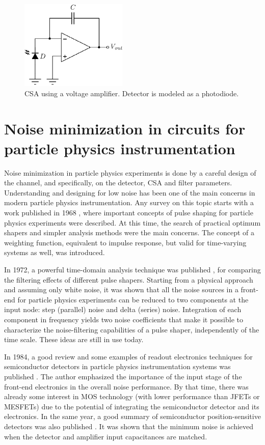 \begin{figure}[!t]
	\centering
	\includegraphics[width=2in]{./Figures/csa_post}
	\caption{CSA using a voltage amplifier. Detector is modeled as a photodiode.}\label{fig:csa_post}
\end{figure}


\section{Noise minimization in circuits for particle physics instrumentation}

Noise minimization in particle physics experiments is done by a careful design of the channel, and specifically, on the detector, CSA and filter parameters. Understanding and designing for low noise has been one of the main concerns in modern particle physics instrumentation. Any survey on this topic starts with a work published in 1968 \citep{radeka104}, where important concepts of pulse shaping for particle physics experiments were described. At this time, the search of practical optimum shapers and simpler analysis methods were the main concerns. The concept of a weighting function, equivalent to impulse response, but valid for time-varying systems as well, was introduced.

In 1972, a powerful time-domain analysis technique was published \citep{goulding101}, for comparing the filtering effects of different pulse shapers. Starting from a physical approach and assuming only white noise, it was shown that all the noise sources in a front-end for particle physics experiments can be reduced to two components at the input node: step (parallel) noise and delta (series) noise. Integration of each component in frequency yields two noise coefficients that make it possible to characterize the noise-filtering capabilities of a pulse shaper, independently of the time scale. These ideas are still in use today.

In 1984, a good review and some examples of readout electronics techniques for semiconductor detectors in particle physics instrumentation systems was published \citep{gatti103}. The author emphasized the importance of the input stage of the front-end electronics in the overall noise performance. By that time, there was already some interest in MOS technology (with lower performance than JFETs or MESFETs) due to the potential of integrating the semiconductor detector and its electronics. In the same year, a good summary of semiconductor position-sensitive detectors was also published \citep{radeka105}. It was shown that the minimum noise is achieved when the detector and amplifier input capacitances are matched.

